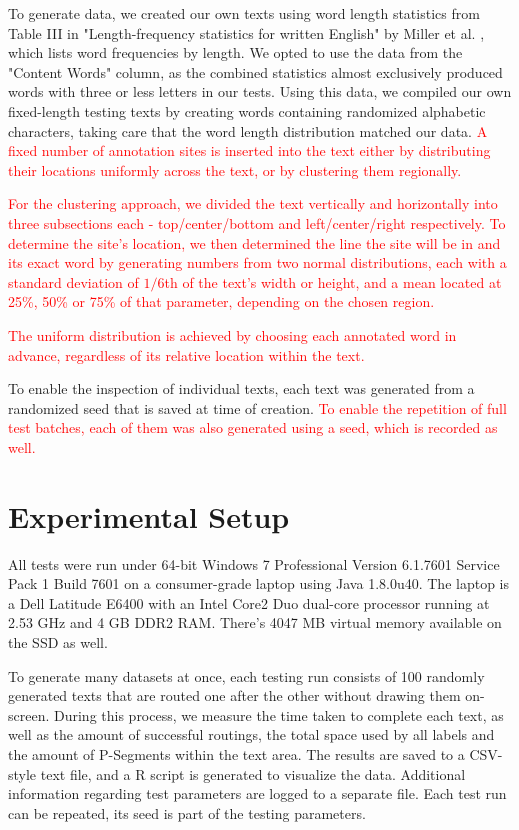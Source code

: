 \documentclass[11pt,a4paper]{vutinfth}
\newcommand{\change}[1]{\textcolor{red}{#1}}
\begin{document}
To generate data, we created our own texts using word length statistics from Table III in "Length-frequency statistics for written English" by Miller et al. \cite{Miller1958}, which lists word frequencies by length. We opted to use the data from the "Content Words" column, as the combined statistics almost exclusively produced words with three or less letters in our tests.
Using this data, we compiled our own fixed-length testing texts by creating words containing randomized alphabetic characters, taking care that the word length distribution matched our data.
\change{A fixed number of annotation sites is inserted into the text either by distributing their locations uniformly across the text, or by clustering them regionally.}
	
\change{For the clustering approach, we divided the text vertically and horizontally into three subsections each - top/center/bottom and left/center/right respectively. To determine the site's location, we then determined the line the site will be in and its exact word by generating numbers from two normal distributions, each with a standard deviation of $1/6$th of the text's width or height, and a mean located at 25\%, 50\% or 75\% of that parameter, depending on the chosen region.}

\change{The uniform distribution is achieved by choosing each annotated word in advance, regardless of its relative location within the text.}

To enable the inspection of individual texts, each text was generated from a randomized seed that is saved at time of creation. \change{To enable the repetition of full test batches, each of them was also generated using a seed, which is recorded as well.}

\section{Experimental Setup}

All tests were run under 64-bit Windows 7 Professional Version 6.1.7601 Service Pack 1 Build 7601 on a consumer-grade laptop using Java 1.8.0u40. The laptop is a Dell Latitude E6400 with an Intel Core2 Duo dual-core processor running at 2.53 GHz and 4 GB DDR2 RAM. There's 4047 MB virtual memory available on the SSD as well.

To generate many datasets at once, each testing run consists of 100 randomly generated texts that are routed one after the other without drawing them on-screen. During this process, we measure the time taken to complete each text, as well as the amount of successful routings, the total space used by all labels and the amount of P-Segments within the text area.
The results are saved to a CSV-style text file, and a R script is generated to visualize the data. Additional information regarding test parameters are logged to a separate file.
Each test run can be repeated, its seed is part of the testing parameters.
\end{document}

